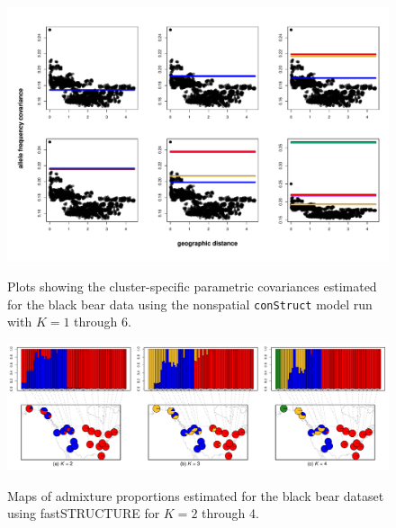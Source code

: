 \documentclass[10pt,letterpaper]{article}
\begin{document}
\begin{figure}
	\centering
		{\includegraphics[width=\textwidth]{figs/bears/bear_nsp_layer_covs.pdf}}
	\caption{
	Plots showing the cluster-specific parametric covariances 
	estimated for the black bear data using 
	the nonspatial \texttt{conStruct} model run with $K=1$ through 6.
    }\label{bear_nsp_layer_covs}
\end{figure}

\begin{figure}
	\centering
		{\includegraphics[width=\textwidth]{figs/bears/bear_fastStr_results.pdf}}
	\caption{
	Maps of admixture proportions estimated for the black bear dataset 
	using fastSTRUCTURE \cite{fastStructure} for $K=2$ through 4.
    }\label{bear_fastStr}
\end{figure}

\fi
\end{document}

